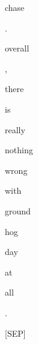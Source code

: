 \documentclass[varwidth=150mm]{standalone}
\begin{document}
\begin{CJK*}{UTF8}{gbsn}
{{{\colorbox{red!1.1759827136993408}{\strut chase} \colorbox{red!0.0}{\strut .} \colorbox{red!16.52836799621582}{\strut overall} \colorbox{red!1.547965168952942}{\strut ,} \colorbox{red!4.659937858581543}{\strut there} \colorbox{red!21.042478561401367}{\strut is} \colorbox{red!41.357200622558594}{\strut really} \colorbox{red!5.184701442718506}{\strut nothing} \colorbox{red!1.8088148832321167}{\strut wrong} \colorbox{red!8.955900192260742}{\strut with} \colorbox{red!19.998271942138672}{\strut ground}\colorbox{red!6.13122034072876}{\strut hog} \colorbox{red!5.363803386688232}{\strut day} \colorbox{red!1.0831304788589478}{\strut at} \colorbox{red!0.0}{\strut all} \colorbox{red!9.77424430847168}{\strut .} \colorbox{red!1.795767903327942}{\strut [SEP]}
}}}
\end{CJK*}
\end{document}
